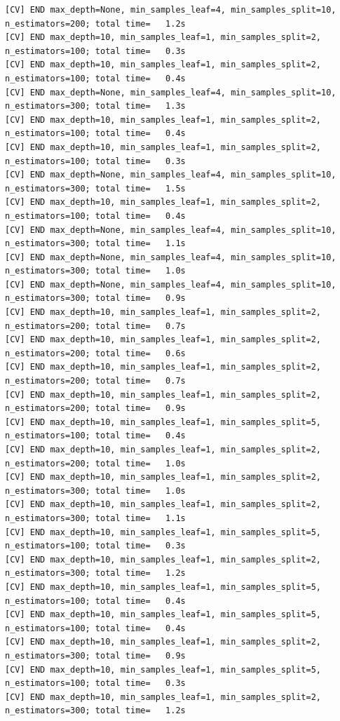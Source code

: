 \documentclass[
  11pt,
  letterpaper,
  DIV=11,
  numbers=noendperiod]{scrartcl}
\begin{document}
\begin{verbatim}
[CV] END max_depth=None, min_samples_leaf=4, min_samples_split=10, n_estimators=200; total time=   1.2s
[CV] END max_depth=10, min_samples_leaf=1, min_samples_split=2, n_estimators=100; total time=   0.3s
[CV] END max_depth=10, min_samples_leaf=1, min_samples_split=2, n_estimators=100; total time=   0.4s
[CV] END max_depth=None, min_samples_leaf=4, min_samples_split=10, n_estimators=300; total time=   1.3s
[CV] END max_depth=10, min_samples_leaf=1, min_samples_split=2, n_estimators=100; total time=   0.4s
[CV] END max_depth=10, min_samples_leaf=1, min_samples_split=2, n_estimators=100; total time=   0.3s
[CV] END max_depth=None, min_samples_leaf=4, min_samples_split=10, n_estimators=300; total time=   1.5s
[CV] END max_depth=10, min_samples_leaf=1, min_samples_split=2, n_estimators=100; total time=   0.4s
[CV] END max_depth=None, min_samples_leaf=4, min_samples_split=10, n_estimators=300; total time=   1.1s
[CV] END max_depth=None, min_samples_leaf=4, min_samples_split=10, n_estimators=300; total time=   1.0s
[CV] END max_depth=None, min_samples_leaf=4, min_samples_split=10, n_estimators=300; total time=   0.9s
[CV] END max_depth=10, min_samples_leaf=1, min_samples_split=2, n_estimators=200; total time=   0.7s
[CV] END max_depth=10, min_samples_leaf=1, min_samples_split=2, n_estimators=200; total time=   0.6s
[CV] END max_depth=10, min_samples_leaf=1, min_samples_split=2, n_estimators=200; total time=   0.7s
[CV] END max_depth=10, min_samples_leaf=1, min_samples_split=2, n_estimators=200; total time=   0.9s
[CV] END max_depth=10, min_samples_leaf=1, min_samples_split=5, n_estimators=100; total time=   0.4s
[CV] END max_depth=10, min_samples_leaf=1, min_samples_split=2, n_estimators=200; total time=   1.0s
[CV] END max_depth=10, min_samples_leaf=1, min_samples_split=2, n_estimators=300; total time=   1.0s
[CV] END max_depth=10, min_samples_leaf=1, min_samples_split=2, n_estimators=300; total time=   1.1s
[CV] END max_depth=10, min_samples_leaf=1, min_samples_split=5, n_estimators=100; total time=   0.3s
[CV] END max_depth=10, min_samples_leaf=1, min_samples_split=2, n_estimators=300; total time=   1.2s
[CV] END max_depth=10, min_samples_leaf=1, min_samples_split=5, n_estimators=100; total time=   0.4s
[CV] END max_depth=10, min_samples_leaf=1, min_samples_split=5, n_estimators=100; total time=   0.4s
[CV] END max_depth=10, min_samples_leaf=1, min_samples_split=2, n_estimators=300; total time=   0.9s
[CV] END max_depth=10, min_samples_leaf=1, min_samples_split=5, n_estimators=100; total time=   0.3s
[CV] END max_depth=10, min_samples_leaf=1, min_samples_split=2, n_estimators=300; total time=   1.2s

\end{verbatim}
\end{document}
